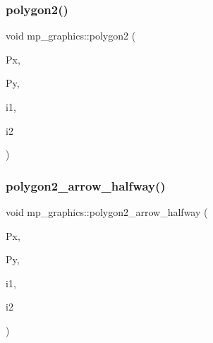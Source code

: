 \subsubsection{\texorpdfstring{polygon2()}{polygon2()}}
{\footnotesize\ttfamily void mp\+\_\+graphics\+::polygon2 (\begin{DoxyParamCaption}\item[{\mbox{\hyperlink{galois_8h_a09fddde158a3a20bd2dcadb609de11dc}{I\+NT}} $\ast$}]{Px,  }\item[{\mbox{\hyperlink{galois_8h_a09fddde158a3a20bd2dcadb609de11dc}{I\+NT}} $\ast$}]{Py,  }\item[{\mbox{\hyperlink{galois_8h_a09fddde158a3a20bd2dcadb609de11dc}{I\+NT}}}]{i1,  }\item[{\mbox{\hyperlink{galois_8h_a09fddde158a3a20bd2dcadb609de11dc}{I\+NT}}}]{i2 }\end{DoxyParamCaption})}

\mbox{\label{classmp__graphics_a32863a10f2e01e8d3433cb960d540126}} 
\subsubsection{\texorpdfstring{polygon2\+\_\+arrow\+\_\+halfway()}{polygon2\_arrow\_halfway()}}
{\footnotesize\ttfamily void mp\+\_\+graphics\+::polygon2\+\_\+arrow\+\_\+halfway (\begin{DoxyParamCaption}\item[{\mbox{\hyperlink{galois_8h_a09fddde158a3a20bd2dcadb609de11dc}{I\+NT}} $\ast$}]{Px,  }\item[{\mbox{\hyperlink{galois_8h_a09fddde158a3a20bd2dcadb609de11dc}{I\+NT}} $\ast$}]{Py,  }\item[{\mbox{\hyperlink{galois_8h_a09fddde158a3a20bd2dcadb609de11dc}{I\+NT}}}]{i1,  }\item[{\mbox{\hyperlink{galois_8h_a09fddde158a3a20bd2dcadb609de11dc}{I\+NT}}}]{i2 }\end{DoxyParamCaption})}

\mbox{\label{classmp__graphics_a4f93744250eba12fc348a379f678ea22}} 
